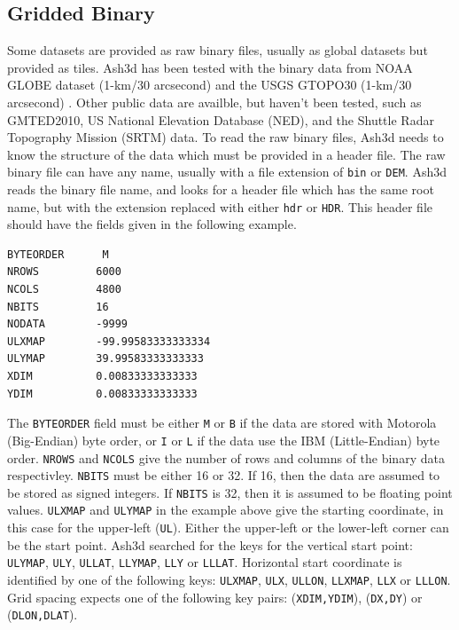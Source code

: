 \subsection{Gridded Binary}
Some datasets are provided as raw binary files, usually as global datasets but
provided as tiles. Ash3d has been tested with the binary data from NOAA GLOBE 
dataset (1-km/30 arcsecond) \cite{NOAAGLOBE} and the USGS GTOPO30 (1-km/30 arcsecond)
\cite{USGSGTOPO30}. Other public data are availble, but haven't been tested, such as
GMTED2010, US National Elevation Database (NED), and the Shuttle Radar Topography
Mission (SRTM) data. To read the raw binary files, Ash3d needs to know the
structure of the data which must be provided in a header file. The raw binary
file can have any name, usually with a file extension of \texttt{bin} or
\texttt{DEM}. Ash3d reads the binary file name, and looks for a header file which
has the same root name, but with the extension replaced with either \texttt{hdr}
or \texttt{HDR}. This header file should have the fields given in the following
example.
\small
\begin{verbatim}
BYTEORDER      M
NROWS         6000
NCOLS         4800
NBITS         16
NODATA        -9999
ULXMAP        -99.99583333333334
ULYMAP        39.99583333333333
XDIM          0.00833333333333
YDIM          0.00833333333333
\end{verbatim}
\normalsize
The \texttt{BYTEORDER} field must be either \texttt{M} or \texttt{B} if the data are stored
with Motorola (Big-Endian) byte order, or \texttt{I} or \texttt{L} if the data use
the IBM (Little-Endian) byte order. \texttt{NROWS} and \texttt{NCOLS} give the
number of rows and columns of the binary data respectivley. \texttt{NBITS} must
be either 16 or 32. If 16, then the data are assumed to be stored as signed
integers. If \texttt{NBITS} is 32, then it is assumed to be floating point values.
\texttt{ULXMAP} and \texttt{ULYMAP} in the example above give the starting
coordinate, in this case for the upper-left (\texttt{UL}). Either the upper-left
or the lower-left corner can be the start point. Ash3d searched for the keys
for the vertical start point:
\texttt{ULYMAP}, \texttt{ULY}, \texttt{ULLAT}, \texttt{LLYMAP}, \texttt{LLY} or \texttt{LLLAT}.
Horizontal start coordinate is identified by one of the following keys:
\texttt{ULXMAP}, \texttt{ULX}, \texttt{ULLON}, \texttt{LLXMAP}, \texttt{LLX} or \texttt{LLLON}.
Grid spacing expects one of the following key pairs:
(\texttt{XDIM,YDIM}), (\texttt{DX,DY}) or (\texttt{DLON,DLAT}).

